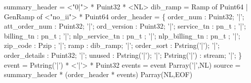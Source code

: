  summary\_header = <"0|"> * Puint32 * <NL>
\mbox{}
 dib\_ramp = 
  Ramp of Puint64 
| GenRamp of <"no\_ii"> * Puint64
\mbox{}
 order\_header = \{
       order\_num      : Puint32;
 '|';  att\_order\_num  : Puint32;             
 '|';  ord\_version    : Puint32;         
 '|';  service\_tn     : pn\_t ;
 '|';  billing\_tn     : pn\_t ;          
 '|';  nlp\_service\_tn : pn\_t ;
 '|';  nlp\_billing\_tn : pn\_t ;
 '|';  zip\_code       : Pzip ;
 '|';  ramp           : dib\_ramp; 
 '|';  order\_sort     : Pstring('|');
 '|';  order\_details  : Puint32;             
 '|';  unused         : Pstring('|');
 '|';  Pstring('|')   : stream;
 '|';
\}
\mbox{}
 event  = Pstring('|') *  <'|'> * Puint32
\mbox{}
 events = event Parray('|',NL)
\mbox{}
 source = summary\_header * (order\_header * events) Parray(NL,EOF)
